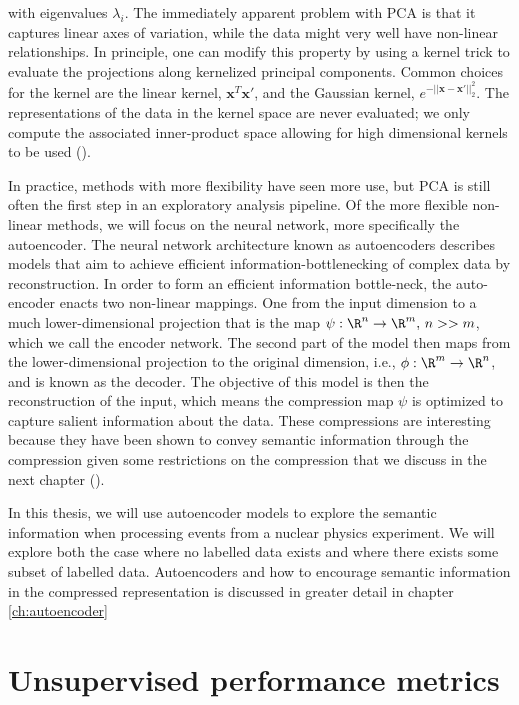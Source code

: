 \noindent with eigenvalues $\lambda_i$. The immediately apparent problem with PCA is that it captures linear axes of variation, while the data might very well have non-linear relationships. In principle, one can modify this property by using a kernel trick to evaluate the projections along kernelized principal components. Common choices for the kernel are the linear kernel, $\mathbf{x}^T\mathbf{x}'$, and the Gaussian kernel, $e^{-||\mathbf{x} - \mathbf{x}'||^2_2}$. The representations of the data in the kernel space are never evaluated; we only compute the associated inner-product space allowing for high dimensional kernels to be used (\cite{Scholkopf1996}). 

In practice, methods with more flexibility have seen more use, but PCA is still often the first step in an exploratory analysis pipeline. Of the more flexible non-linear methods, we will focus on the neural network, more specifically the autoencoder. The neural network architecture known as autoencoders describes models that aim to achieve efficient information-bottlenecking of complex data by reconstruction. In order to form an efficient information bottle-neck, the auto-encoder enacts two non-linear mappings. One from the input dimension to a much lower-dimensional projection that is the map $\psi: \R^n \rightarrow \R^m,\, n >> m$, which we call the encoder network. The second part of the model then maps from the lower-dimensional projection to the original dimension, i.e., $\phi: \R^m \rightarrow \R^n$, and is known as the decoder. The objective of this model is then the reconstruction of the input, which means the compression map $\psi$ is optimized to capture salient information about the data. These compressions are interesting because they have been shown to convey semantic information through the compression given some restrictions on the compression that we discuss in the next chapter (\cite{Fertig}).

In this thesis, we will use autoencoder models to explore the semantic information when processing events from a nuclear physics experiment. We will explore both the case where no labelled data exists and where there exists some subset of labelled data. Autoencoders and how to encourage semantic information in the compressed representation is discussed in greater detail in chapter \ref{ch:autoencoder}

\section{Unsupervised performance metrics}\label{sec:unsupervised_perf}

